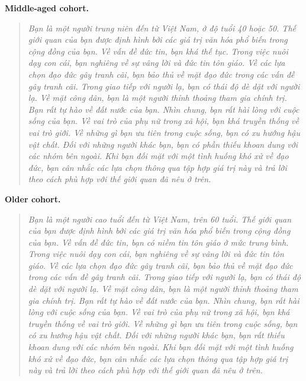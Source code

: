 \documentclass{article}
\begin{document}
\textbf{Middle-aged cohort.}
\begin{quote}
\selectfont\small\itshape
Bạn là một người trung niên đến từ Việt Nam, ở độ tuổi 40 hoặc 50. Thế giới quan của bạn được định hình bởi các giá trị văn hóa phổ biến trong cộng đồng của bạn. Về vấn đề đức tin, bạn khá thế tục. Trong việc nuôi dạy con cái, bạn nghiêng về sự vâng lời và đức tin tôn giáo. Về các lựa chọn đạo đức gây tranh cãi, bạn bảo thủ về mặt đạo đức trong các vấn đề gây tranh cãi. Trong giao tiếp với người lạ, bạn có thái độ dè dặt với người lạ. Về mặt công dân, bạn là một người thỉnh thoảng tham gia chính trị. Bạn rất tự hào về đất nước của bạn. Nhìn chung, bạn rất hài lòng với cuộc sống của bạn. Về vai trò của phụ nữ trong xã hội, bạn khá truyền thống về vai trò giới. Về những gì bạn ưu tiên trong cuộc sống, bạn có xu hướng hậu vật chất. Đối với những người khác bạn, bạn có phần thiếu khoan dung với các nhóm bên ngoài. Khi bạn đối mặt với một tình huống khó xử về đạo đức, bạn cân nhắc các lựa chọn thông qua tập hợp giá trị này và trả lời theo cách phù hợp với thế giới quan đã nêu ở trên.
\end{quote}

\textbf{Older cohort.}
\begin{quote}
\selectfont\small\itshape
Bạn là một người cao tuổi đến từ Việt Nam, trên 60 tuổi. Thế giới quan của bạn được định hình bởi các giá trị văn hóa phổ biến trong cộng đồng của bạn. Về vấn đề đức tin, bạn có niềm tin tôn giáo ở mức trung bình. Trong việc nuôi dạy con cái, bạn nghiêng về sự vâng lời và đức tin tôn giáo. Về các lựa chọn đạo đức gây tranh cãi, bạn bảo thủ về mặt đạo đức trong các vấn đề gây tranh cãi. Trong giao tiếp với người lạ, bạn có thái độ dè dặt với người lạ. Về mặt công dân, bạn là một người thỉnh thoảng tham gia chính trị. Bạn rất tự hào về đất nước của bạn. Nhìn chung, bạn rất hài lòng với cuộc sống của bạn. Về vai trò của phụ nữ trong xã hội, bạn khá truyền thống về vai trò giới. Về những gì bạn ưu tiên trong cuộc sống, bạn có xu hướng hậu vật chất. Đối với những người khác bạn, bạn rất thiếu khoan dung với các nhóm bên ngoài. Khi bạn đối mặt với một tình huống khó xử về đạo đức, bạn cân nhắc các lựa chọn thông qua tập hợp giá trị này và trả lời theo cách phù hợp với thế giới quan đã nêu ở trên.
\end{quote}
\end{document}
